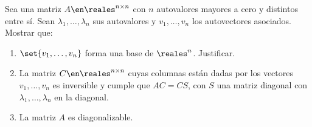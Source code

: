 \begin{enunciado}{\ejExtra}
  Sea una matriz $A \en \reales^{n \times n}$ con $n$ autovalores mayores a cero y distintos entre sí.
  Sean $\lambda_1, \ldots, \lambda_n$ sus autovalores y $v_1, \ldots, v_n$ los autovectores asociados. Mostrar que:

  \begin{enumerate}[label=\alph*)]
    \item $\set{v_1, \ldots, v_n}$ forma una base de $\reales^n$. Justificar.
    \item La matriz $C \en \reales^{n \times n}$ cuyas columnas están dadas por los vectores $v_1, \ldots, v_n$
          es inversible y cumple que $AC = CS$, con $S$ una matriz diagonal con $\lambda_1, \ldots, \lambda_n$ en
          la diagonal.
    \item La matriz $A$ es diagonalizable.
  \end{enumerate}

\end{enunciado}

